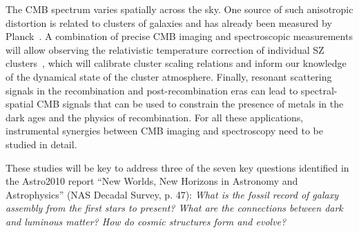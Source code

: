 The CMB spectrum varies spatially across the sky. One source of such anisotropic distortion is related to clusters of galaxies and has already been measured by Planck~\citep{Planck2013SZ}. A combination of precise CMB imaging and spectroscopic measurements will allow observing the relativistic temperature correction of individual SZ clusters~\citep{Sazonov1998, Itoh98, Challinor98}, which will calibrate cluster scaling relations and inform our knowledge of the dynamical state of the cluster atmosphere. Finally, resonant scattering signals in the recombination \citep{Jose2005, Carlos2007Pol, Lewis2013} and post-recombination eras \citep{Kaustuv2004, Schleicher2008} can lead to spectral-spatial CMB signals that can be used to constrain the presence of metals in the dark ages and the physics of recombination. For all these applications, instrumental synergies between CMB imaging and spectroscopy need to be studied in detail. 



These studies will be key to address three of the seven key questions identified in the Astro2010 report ``New Worlds, New Horizons in Astronomy and Astrophysics'' (NAS Decadal Survey, p. 47): {\it What is the fossil record of galaxy assembly                                                                               
from the first stars to present? What are the connections between dark and luminous matter? How do cosmic structures form and evolve?}






